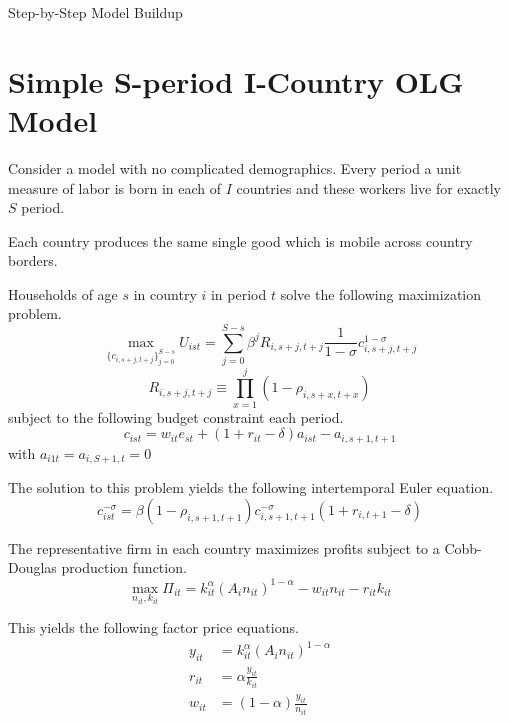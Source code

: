 \documentclass[letterpaper,12pt]{article}
\theoremstyle{definition}
\numberwithin{equation}{section}
\begin{document}
\begin{spacing}{1.5}


\LARGE{Step-by-Step Model Buildup} \normalsize

\section{Simple S-period I-Country OLG Model}
	Consider a model with no complicated demographics.  Every period a unit measure of labor is born in each of $I$ countries and these workers live for exactly $S$ period.

	Each country produces the same single good which is mobile across country borders.

	Households of age $s$ in country $i$ in period $t$ solve the following maximization problem.
	\begin{equation}
		\max_{\{c_{i,s+j,t+j}\}_{j=0}^{S-s}} U_{ist} = \sum_{j=0}^{S-s} \beta^j R_{i,s+j,t+j} \frac{1}{1-\sigma} c_{i,s+j,t+j}^{1-\sigma} \nonumber
	\end{equation}
	\begin{equation}
		R_{i,s+j,t+j} \equiv \prod_{x=1}^j (1-\rho_{i,s+x,t+x}) \nonumber
	\end{equation}
	subject to the following budget constraint each period.
	\begin{equation} \label{Eq_HHbc}
		c_{ist} = w_{it} e_{st} + (1+r_{it}-\delta)a_{ist} - a_{i,s+1,t+1}
	\end{equation}
	with $a_{i1t} = a_{i,S+1,t} = 0$

	The solution to this problem yields the following intertemporal Euler equation.
	\begin{equation} \label{Eq_HHEuler1}
		c_{ist}^{-\sigma} = \beta (1-\rho_{i,s+1,t+1}) c_{i,s+1,t+1}^{-\sigma}(1+r_{i,t+1}-\delta)
	\end{equation}

	The representative firm in each country maximizes profits subject to a Cobb-Douglas production function.
	\begin{equation}
		\max_{n_{it},k_{it}} \Pi_{it} = k_{it}^\alpha \left( A_{i} n_{it} \right)^{1-\alpha} - w_{it}n_{it} - r_{it}k_{it} \nonumber
	\end{equation}

	This yields the following factor price equations.
	\begin{align}
		y_{it} & = k_{it}^\alpha \left( A_{i} n_{it} \right)^{1-\alpha} \\
		r_{it} & = \alpha \frac{y_{it}}{k_{it}} \\
		w_{it} & = (1-\alpha) \frac{y_{it}}{n_{it}}
	\end{align}


\end{spacing}
\end{document}
